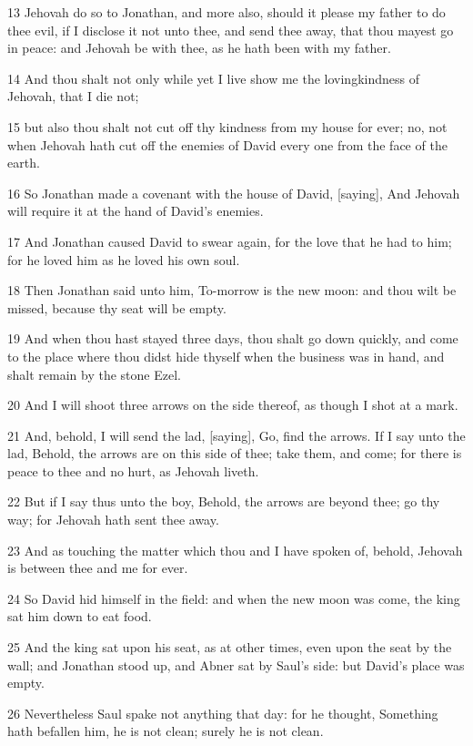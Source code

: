 \par 13 Jehovah do so to Jonathan, and more also, should it please my father to do thee evil, if I disclose it not unto thee, and send thee away, that thou mayest go in peace: and Jehovah be with thee, as he hath been with my father.
\par 14 And thou shalt not only while yet I live show me the lovingkindness of Jehovah, that I die not;
\par 15 but also thou shalt not cut off thy kindness from my house for ever; no, not when Jehovah hath cut off the enemies of David every one from the face of the earth.
\par 16 So Jonathan made a covenant with the house of David, [saying], And Jehovah will require it at the hand of David's enemies.
\par 17 And Jonathan caused David to swear again, for the love that he had to him; for he loved him as he loved his own soul.
\par 18 Then Jonathan said unto him, To-morrow is the new moon: and thou wilt be missed, because thy seat will be empty.
\par 19 And when thou hast stayed three days, thou shalt go down quickly, and come to the place where thou didst hide thyself when the business was in hand, and shalt remain by the stone Ezel.
\par 20 And I will shoot three arrows on the side thereof, as though I shot at a mark.
\par 21 And, behold, I will send the lad, [saying], Go, find the arrows. If I say unto the lad, Behold, the arrows are on this side of thee; take them, and come; for there is peace to thee and no hurt, as Jehovah liveth.
\par 22 But if I say thus unto the boy, Behold, the arrows are beyond thee; go thy way; for Jehovah hath sent thee away.
\par 23 And as touching the matter which thou and I have spoken of, behold, Jehovah is between thee and me for ever.
\par 24 So David hid himself in the field: and when the new moon was come, the king sat him down to eat food.
\par 25 And the king sat upon his seat, as at other times, even upon the seat by the wall; and Jonathan stood up, and Abner sat by Saul's side: but David's place was empty.
\par 26 Nevertheless Saul spake not anything that day: for he thought, Something hath befallen him, he is not clean; surely he is not clean.
